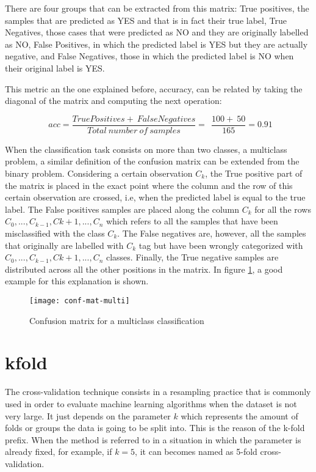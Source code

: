 	There are four groups that can be extracted from this matrix: True positives, the samples that are predicted as YES and that is in fact their true label, True Negatives, those cases that were predicted as NO and they are originally labelled as NO, False Positives, in which the predicted label is YES but they are actually negative, and False Negatives, those in which the predicted label is NO when their original label is YES.
	
	This metric an the one explained before, accuracy, can be related by taking the diagonal of the matrix and computing the next operation:
	
	\[
	\ \ acc = \frac{TruePositives +\ FalseNegatives}{Total\ number\ of\ samples} = 
	\ \ \frac{100 +\ 50}{165} = 0.91
	\]
	
	When the classification task consists on more than two classes, a multiclass problem, a similar definition of the confusion matrix can be extended from the binary problem. Considering a certain observation $C_k$, the True positive part of the matrix is placed in the exact point where the column and the row of this certain observation are crossed, i.e, when the predicted label is equal to the true label. The False positives samples are placed along the column $C_k$ for all the rows $C_0, ..., C_{k-1}, C{k+1}, ..., C_n$ which refers to all the samples that have been misclassified with the class $C_k$. The False negatives are, however, all the samples that originally are labelled with $C_k$ tag but have been wrongly categorized with $C_0, ..., C_{k-1}, C{k+1}, ..., C_n$ classes. Finally, the True negative samples are distributed across all the other positions in the matrix. In figure \ref{fig:mesh9}, a good example for this explanation is shown.
	
	\begin{figure}[h]
		\centering
		\captionsetup{justification=centering}
		\texttt{[image: conf-mat-multi]}
		\caption{Confusion matrix for a multiclass classification \cite{Kruger2018}}
		\label{fig:mesh9}
	\end{figure}
	
\section{\acrlong{kfold}}
\label{appendix:kfold}

	The cross-validation technique consists in a resampling practice that is commonly used in order to evaluate machine learning algorithms when the dataset is not very large. It just depends on the parameter $k$ which represents the amount of folds or groups the data is going to be split into. This is the reason of the k-fold prefix. When the method is referred to in a situation in which the parameter is already fixed, for example, if $k = 5$, it can becomes named as 5-fold cross-validation.
	
